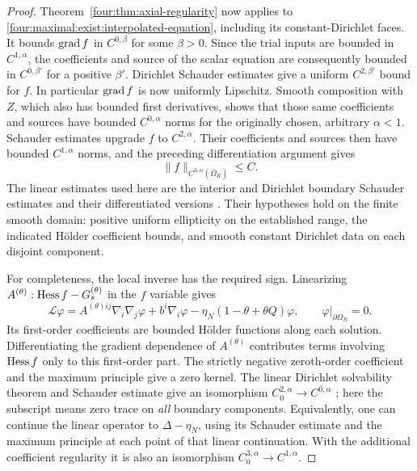 \begin{proof}
Theorem~\ref{four:thm:axial-regularity} now applies to
\eqref{four:maximal:exist:interpolated-equation}, including its constant-Dirichlet
faces.  It bounds $\operatorname{grad} f$ in $C^{0,\beta}$ for some $\beta>0$.
Since the trial inputs are bounded in $C^{1,\alpha}$, the coefficients
and source of the scalar equation are consequently bounded in
$C^{0,\beta'}$ for a positive $\beta'$.  Dirichlet Schauder estimates
give a uniform $C^{2,\beta'}$ bound for $f$.
In particular $\operatorname{grad} f$ is now uniformly Lipschitz.  Smooth composition
with $Z$, which also has bounded first derivatives, shows that those
same coefficients and sources have bounded $C^{0,\alpha}$ norms for
the originally chosen, arbitrary $\alpha<1$.
Schauder estimates upgrade $f$ to $C^{2,\alpha}$.
Their coefficients and sources then have bounded $C^{1,\alpha}$
norms, and the preceding differentiation argument gives
\begin{equation}\label{four:maximal:exist:scalar-schauder}
 \|f\|_{C^{3,\alpha}(\overline\Omega_R)}\le C.
\end{equation}
The linear estimates used here are the interior and Dirichlet boundary
Schauder estimates and their differentiated versions
\cite[Sections~6.1--6.4]{GilbargTrudinger2001}.  Their hypotheses hold on the finite
smooth domain: positive uniform ellipticity on the established range,
the indicated H\"older coefficient bounds, and smooth constant
Dirichlet data on each disjoint component.

For completeness, the local inverse has the required sign.
Linearizing $A^{(\theta)}:\operatorname{Hess} f-G_s^{(\theta)}$ in the $f$
variable gives
\begin{equation}\label{four:maximal:exist:scalar-linearization}
 \mathcal L\varphi
    = A^{(\theta)ij}\nabla_i\nabla_j\varphi
           +b^i\nabla_i\varphi
           -\eta_N(1-\theta+\theta Q)\varphi,
      \qquad \varphi|_{\partial\Omega_R}=0.
\end{equation}
Its first-order coefficients are bounded H\"older functions along each
solution.  Differentiating the gradient dependence of $A^{(\theta)}$
contributes terms involving $\operatorname{Hess} f$ only to this first-order part.
The strictly negative zeroth-order coefficient and the maximum
principle give a zero kernel.  The linear Dirichlet solvability theorem
and Schauder estimate give an isomorphism
$C^{2,\alpha}_0\to C^{0,\alpha}$
\cite[Sections~6.2--6.3]{GilbargTrudinger2001}; here the subscript means zero
trace on \emph{all} boundary components.  Equivalently, one can
continue the linear operator to $\Delta-\eta_N$, using its Schauder
estimate and the maximum principle at each point of that linear
continuation.  With the additional coefficient regularity it is also
an isomorphism $C^{3,\alpha}_0\to C^{1,\alpha}$.


\end{proof}
